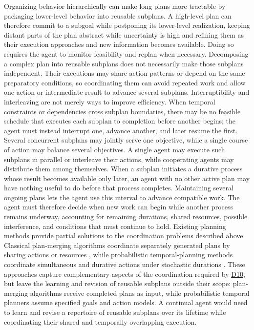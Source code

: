 \documentclass[10pt,journal,compsoc]{IEEEtran}
\DeclareRobustCommand{\Dref}[1]{\hyperref[sec:d#1]{D#1}}
\begin{document}
\noindent Organizing behavior hierarchically can make long plans more tractable by packaging lower-level behavior into reusable subplans.
A high-level plan can therefore commit to a subgoal while postponing its lower-level realization, keeping distant parts of the plan abstract while uncertainty is high and refining them as their execution approaches and new information becomes available.
Doing so requires the agent to monitor feasibility and replan when necessary.
Decomposing a complex plan into reusable subplans does not necessarily make those subplans independent.
Their executions may share action patterns or depend on the same preparatory conditions, so coordinating them can avoid repeated work and allow one action or intermediate result to advance several subplans.
Interruptibility and interleaving are not merely ways to improve efficiency.
When temporal constraints or dependencies cross subplan boundaries, there may be no feasible schedule that executes each subplan to completion before another begins; the agent must instead interrupt one, advance another, and later resume the first.
Several concurrent subplans may jointly serve one objective, while a single course of action may balance several objectives.
A single agent may execute such subplans in parallel or interleave their actions, while cooperating agents may distribute them among themselves.
When a subplan initiates a durative process whose result becomes available only later, an agent with no other active plan may have nothing useful to do before that process completes.
Maintaining several ongoing plans lets the agent use this interval to advance compatible work.
The agent must therefore decide when new work can begin while another process remains underway, accounting for remaining durations, shared resources, possible interference, and conditions that must continue to hold.
Existing planning methods provide partial solutions to the coordination problems described above.
Classical plan-merging algorithms coordinate separately generated plans by sharing actions or resources \cite{yang1992}, while probabilistic temporal-planning methods coordinate simultaneous and durative actions under stochastic durations \cite{mausam2008}.
These approaches capture complementary aspects of the coordination required by \Dref{10}, but leave the learning and revision of reusable subplans outside their scope: plan-merging algorithms receive completed plans as input, while probabilistic temporal planners assume specified goals and action models.
A continual agent would need to learn and revise a repertoire of reusable subplans over its lifetime while coordinating their shared and temporally overlapping execution.
\end{document}
